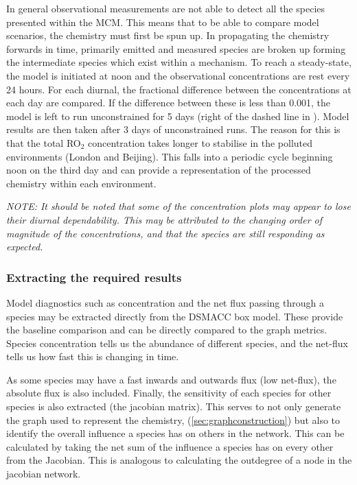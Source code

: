 In general observational measurements are not able to detect all the species presented within the MCM. This means that to be able to compare model scenarios, the chemistry must first be spun up. In propagating the chemistry forwards in time, primarily emitted and measured species are broken up forming the intermediate species which exist within a mechanism. To reach a steady-state, the model is initiated at noon and the observational concentrations are rest every 24 hours. For each diurnal, the fractional difference between the concentrations at each day are compared. If the difference between these is less than 0.001, the model is left to run unconstrained for 5 days (right of the dashed line in ). Model results are then taken after 3 days of unconstrained runs. The reason for this is that the total RO$_2$ concentration takes longer to stabilise in the polluted environments (London and Beijing). This falls into a periodic cycle beginning noon on the third day and can provide a representation of the processed chemistry within each environment. 

\textit{NOTE: It should be noted that some of the concentration plots may appear to lose their diurnal dependability. This may be attributed to the changing order of magnitude of the concentrations, and that the species are still responding as expected. }

\subsubsection{Extracting the required results}
Model diagnostics such as concentration and the net flux passing through a species may be extracted directly from the DSMACC box model. These provide the baseline comparison and can be directly compared to the graph metrics. Species concentration tells us the abundance of different species, and the net-flux tells us how fast this is changing in time. 

As some species may have a fast inwards and outwards flux (low net-flux), the absolute flux is also included. Finally, the sensitivity of each species for other species is also extracted (the jacobian matrix). This serves to not only generate the graph used to represent the chemistry, (\autoref{sec:graphconstruction}) but also to identify the overall influence a species has on others in the network. This can be calculated by taking the net sum of the influence a species has on every other from the Jacobian. This is analogous to calculating the outdegree of a node in the jacobian network. 
\newpage
 
